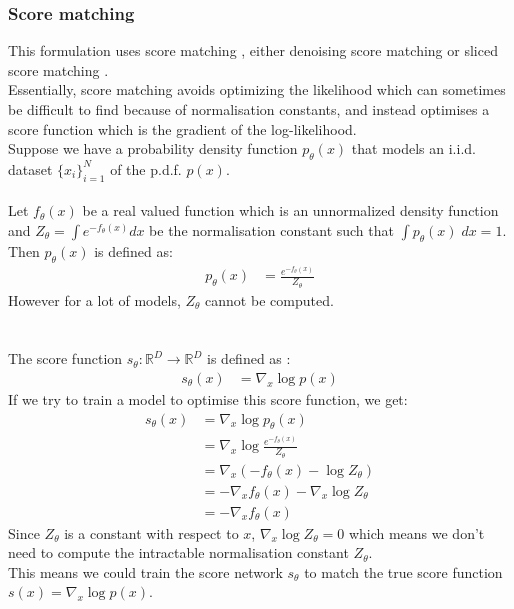 \documentclass{article}
\begin{document}
\subsubsection{Score matching}
This formulation uses score matching \cite{hyvarinen2005}, either denoising score matching \cite{vincent2010denoising} or sliced score matching \cite{song2019sliced}. \\
Essentially, score matching avoids optimizing the likelihood which can sometimes be difficult to find because of normalisation constants, and instead optimises a score function which is the gradient of the log-likelihood. \\
Suppose we have a probability density function $p_\theta (x)$ that models an i.i.d. dataset $\{x_i\}_{i=1}^N$ of the p.d.f. $p(x)$. 
\\\\
Let $f_\theta (x)$ be a real valued function which is an unnormalized density function and $Z_\theta = \int e^{-f_\theta (x)} dx$ be the normalisation constant such that $\int p_\theta (x) \; dx = 1$. \\
Then $p_\theta(x)$ is defined as:
\begin{align}
  p_\theta (x) &= \frac{e^{-f_\theta (x)}}{Z_\theta}
\end{align}
However for a lot of models, $Z_\theta$ cannot be computed. \cite{luo2022understanding} \\
\\\\
The score function $s_\theta: \mathbb{R}^D \rightarrow \mathbb{R}^D$ is defined as \cite{song2020generative}: 
\begin{align}
  s_\theta (x) &= \nabla_x \log p(x)
\end{align}
If we try to train a model to optimise this score function, we get:
\begin{align}
  s_\theta (x) &= \nabla_x \log p_\theta(x) \\
  &= \nabla_x \log \frac{e^{-f_\theta (x)}}{Z_\theta} \\
  &= \nabla_x \left( -f_\theta (x) - \log Z_\theta \right) \\
  &= - \nabla_x f_\theta (x) - \nabla_x \log Z_\theta \\
  &= - \nabla_x f_\theta (x)
\end{align}
Since $Z_\theta$ is a constant with respect to $x$, $\nabla_x \log Z_\theta = 0$ which means we don't need to compute the intractable normalisation constant $Z_\theta$. \\
This means we could train the score network $s_\theta$ to match the true score function $s(x) = \nabla_x \log p(x)$. \\
\end{document}
